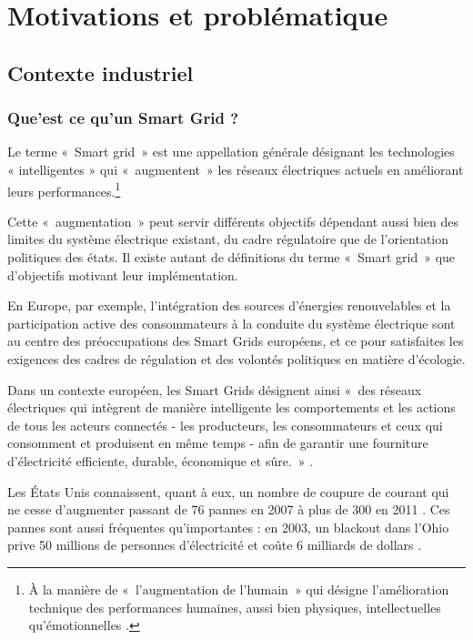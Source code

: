 \chapter{Motivations et problématique}
\label{chap:problematique}

\section{Contexte industriel}

\subsection{Que'est ce qu'un Smart Grid ?}
Le terme «~Smart grid~» est une appellation générale désignant les technologies 
« intelligentes » qui «~augmentent~» les réseaux électriques actuels en 
améliorant leurs performances.\footnote{À la manière de «~l'augmentation de 
l'humain~» qui désigne l'amélioration technique des performances humaines, aussi 
bien physiques, intellectuelles qu'émotionnelles \cite{le2013humain}.}

Cette «~augmentation~» peut servir différents objectifs dépendant aussi bien des 
limites du système électrique existant, du cadre régulatoire que de 
l'orientation politiques des états. Il existe autant de définitions du terme 
«~Smart grid~» que d'objectifs motivant leur implémentation.

En Europe, par exemple, l'intégration des sources d'énergies renouvelables et la 
participation active des consommateurs à la conduite du système électrique sont 
au centre des préoccupations des Smart Grids européens, et ce pour satisfaites 
les exigences des cadres de régulation et des volontés politiques en matière 
d'écologie.

Dans un contexte européen, les Smart Grids désignent ainsi «~des réseaux 
électriques qui intègrent de manière intelligente les comportements et les 
actions de tous les acteurs connectés - les producteurs, les consommateurs et 
ceux qui consomment et produisent en même temps - afin de garantir une 
fourniture d'électricité efficiente, durable, économique et sûre.~» \cite{ETP}.

Les États Unis connaissent, quant à eux, un nombre de coupure de courant qui ne 
cesse d'augmenter passant de 76 pannes en 2007 à plus de 300 en 2011 
\cite{detroit}. Ces pannes sont aussi fréquentes qu'importantes : en 2003, un 
blackout dans l'Ohio prive 50 millions de personnes d'électricité et coûte 6 
milliards de dollars \cite{andersson2005causes}.

